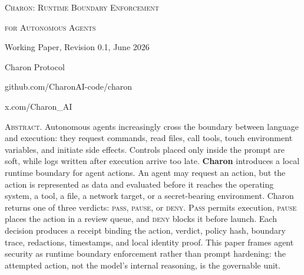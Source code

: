 \documentclass[11pt]{article}
\begin{document}
\begin{center}
  {\LARGE\scshape Charon: Runtime Boundary Enforcement\par}
  \vspace{0.08in}
  {\LARGE\scshape for Autonomous Agents\par}
  \vspace{0.14in}
  {\large Working Paper, Revision 0.1, June 2026\par}
  \vspace{0.28in}
  {\large Charon Protocol\par}
  \vspace{0.06in}
  {\normalsize github.com/CharonAI-code/charon\par}
  \vspace{0.03in}
  {\normalsize x.com/Charon\_AI\par}
\end{center}

\vspace{0.26in}

\noindent\textsc{Abstract.}
Autonomous agents increasingly cross the boundary between language and execution: they
request commands, read files, call tools, touch environment variables, and initiate
side effects. Controls placed only inside the prompt are soft, while logs written after
execution arrive too late. \textbf{Charon} introduces a local runtime boundary for agent
actions. An agent may request an action, but the action is represented as data and
evaluated before it reaches the operating system, a tool, a file, a network target, or a
secret-bearing environment. Charon returns one of three verdicts: \textsc{pass},
\textsc{pause}, or \textsc{deny}. \textsc{Pass} permits execution, \textsc{pause} places
the action in a review queue, and \textsc{deny} blocks it before launch. Each decision
produces a receipt binding the action, verdict, policy hash, boundary trace, redactions,
timestamps, and local identity proof. This paper frames agent security as runtime
boundary enforcement rather than prompt hardening: the attempted action, not the model's
internal reasoning, is the governable unit.

\vspace{0.28in}
\end{document}
